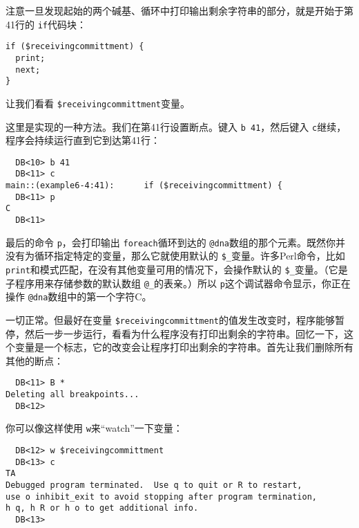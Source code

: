 注意一旦发现起始的两个碱基、循环中打印输出剩余字符串的部分，就是开始于第41行的 \verb|if|代码块：

\begin{lstlisting}
if ($receivingcommittment) {
  print;
  next;
}
\end{lstlisting}

让我们看看 \verb|$receivingcommittment|变量。

这里是实现的一种方法。我们在第41行设置断点。键入 \verb|b 41|，然后键入 \verb|c|继续，程序会持续运行直到它到达第41行：

\begin{lstlisting}
  DB<10> b 41
  DB<11> c
main::(example6-4:41):      if ($receivingcommittment) {
  DB<11> p
C
  DB<11> 
\end{lstlisting}

最后的命令 \verb|p|，会打印输出 \verb|foreach|循环到达的 \verb|@dna|数组的那个元素。既然你并没有为循环指定特定的变量，那么它就使用默认的 \verb|$_|变量。许多Perl命令，比如 \verb|print|和模式匹配，在没有其他变量可用的情况下，会操作默认的 \verb|$_|变量。（它是子程序用来存储参数的默认数组 \verb|@_|的表亲。）所以 \verb|p|这个调试器命令显示，你正在操作 \verb|@dna|数组中的第一个字符C。

一切正常。但最好在变量 \verb|$receivingcommittment|的值发生改变时，程序能够暂停，然后一步一步运行，看看为什么程序没有打印出剩余的字符串。回忆一下，这个变量是一个标志，它的改变会让程序打印出剩余的字符串。首先让我们删除所有其他的断点：

\begin{lstlisting}
  DB<11> B *
Deleting all breakpoints...
  DB<12> 
\end{lstlisting}

你可以像这样使用 \verb|w|来“watch”一下变量：

\begin{lstlisting}
  DB<12> w $receivingcommittment
  DB<13> c
TA
Debugged program terminated.  Use q to quit or R to restart,
use o inhibit_exit to avoid stopping after program termination,
h q, h R or h o to get additional info.
  DB<13> 
\end{lstlisting}

